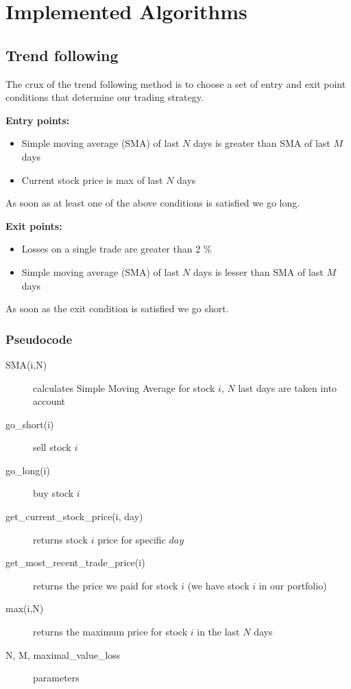 \chapter{Implemented Algorithms}
\label{cha:implementedAlgorithms}




\section{Trend following}
\label{trend_following_impl}

The crux of the trend following method is to choose a set of entry and exit point conditions that determine our trading strategy.



\textbf{Entry points:}
  \begin{itemize}
    \item Simple moving average (SMA) of last $N$ days is greater than SMA of last $M$ days
    \item Current stock price is max of last $N$ days
  \end{itemize}

As soon as at least one of the above conditions is satisfied we go long.


\textbf{Exit points:}
  \begin{itemize}
    \item Losses on a single trade are greater than 2 \% 
    \item Simple moving average (SMA) of last $N$ days is lesser than SMA of last $M$ days
  \end{itemize}

As soon as the exit condition is satisfied we go short.
 

\subsection{Pseudocode}

\begin{description}

\item[SMA(i,N)]
  calculates Simple Moving Average for stock $i$, $N$ last days are taken into account  
\item[go\_short(i)]
  sell stock $i$
\item[go\_long(i)]
  buy stock $i$
\item[get\_current\_stock\_price(i, day)]
  returns stock $i$ price for specific $day$ 
\item[get\_most\_recent\_trade\_price(i)]
  returns the price we paid for stock $i$ (we have stock $i$ in our portfolio)
\item[max(i,N)]
  returns the maximum price for stock $i$ in the last $N$ days
\item[N, M, maximal\_value\_loss]
  parameters 
\end{description}
% 


